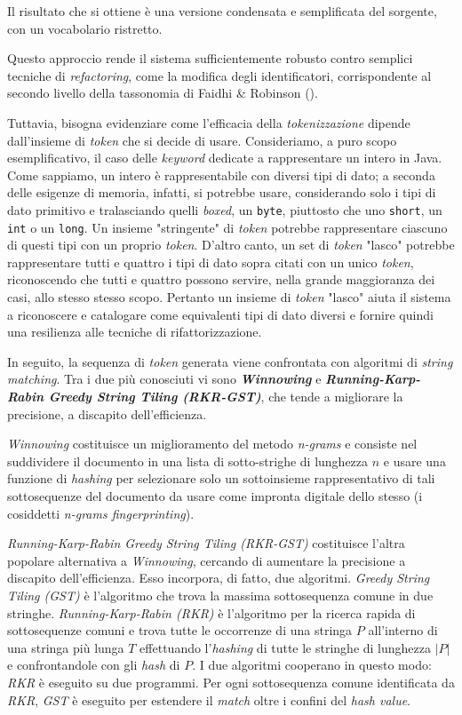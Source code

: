 Il risultato che si ottiene è una versione condensata e semplificata del sorgente, con un vocabolario ristretto.

Questo approccio rende il sistema sufficientemente robusto contro semplici tecniche di \textit{refactoring}, come la modifica degli identificatori, corrispondente al secondo livello della tassonomia di Faidhi \& Robinson ().

Tuttavia, bisogna evidenziare come l'efficacia della \textit{tokenizzazione} dipende dall'insieme di \textit{token} che si decide di usare.
%
Consideriamo, a puro scopo esemplificativo, il caso delle \textit{keyword} dedicate a rappresentare un intero in Java.
%
Come sappiamo, un intero è rappresentabile con diversi tipi di dato; a seconda delle esigenze di memoria, infatti, si potrebbe usare, considerando solo i tipi di dato primitivo e tralasciando quelli \textit{boxed}, un \texttt{byte}, piuttosto che uno \texttt{short}, un \texttt{int} o un \texttt{long}. 
%
Un insieme "stringente" di \textit{token} potrebbe rappresentare ciascuno di questi tipi con un proprio \textit{token}.
%
D'altro canto, un set di \textit{token} "lasco" potrebbe rappresentare tutti e quattro i tipi di dato sopra citati con un unico \textit{token}, riconoscendo che tutti e quattro possono servire, nella grande maggioranza dei casi, allo stesso stesso scopo.
%
Pertanto un insieme di \textit{token} "lasco" aiuta il sistema a riconoscere e catalogare come equivalenti tipi di dato diversi e fornire quindi una resilienza alle tecniche di rifattorizzazione.

In seguito, la sequenza di \textit{token} generata viene confrontata con algoritmi di \textit{string matching}. 
%
Tra i due più conosciuti vi sono \textbf{\textit{Winnowing}} e \textbf{\textit{Running-Karp-Rabin Greedy String Tiling (RKR-GST)}}, che tende a migliorare la precisione, a discapito dell'efficienza. 

\textit{Winnowing} costituisce un miglioramento del metodo \textit{n-grams} e consiste nel suddividere il documento in una lista di sotto-strighe di lunghezza $n$ e  usare una funzione di \textit{hashing} per selezionare solo un sottoinsieme rappresentativo di tali sottosequenze del documento da usare come impronta digitale dello stesso (i cosiddetti \textit{n-grams fingerprinting}).

\textit{Running-Karp-Rabin Greedy String Tiling (RKR-GST)} costituisce l'altra popolare alternativa a \textit{Winnowing}, cercando di aumentare la precisione a discapito dell'efficienza. 
%
Esso incorpora, di fatto, due algoritmi.
%
\textit{Greedy String Tiling (GST)} è l'algoritmo che trova la massima sottosequenza comune in due stringhe.
%
\textit{Running-Karp-Rabin (RKR)} è l'algoritmo per la ricerca rapida di sottosequenze comuni e trova tutte le occorrenze di una stringa $P$ all'interno di una stringa più lunga $T$ effettuando l'\textit{hashing} di tutte le stringhe di lunghezza $|P|$ e confrontandole con gli \textit{hash} di $P$.
%
I due algoritmi cooperano in questo modo: \textit{RKR} è eseguito su due programmi.
%
Per ogni sottosequenza comune identificata da \textit{RKR}, \textit{GST} è eseguito per estendere il \textit{match} oltre i confini del \textit{hash value}.

